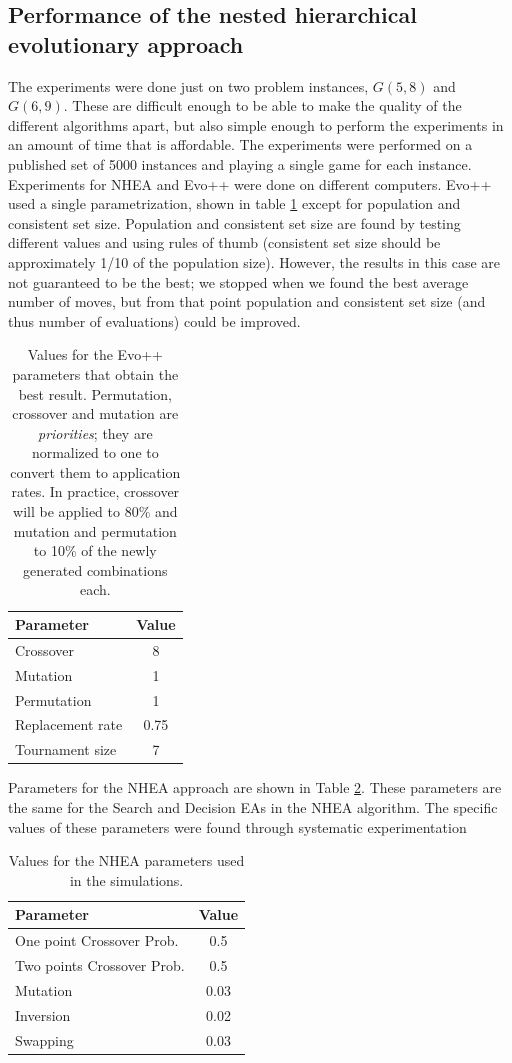 \subsection{Performance of the nested hierarchical evolutionary approach}

The experiments were done just on two problem instances, $G(5,8)$ and $G(6,9)$. These are difficult enough to be able
to make the quality of the different algorithms apart, but also simple
enough to perform the experiments in an amount of time that is
affordable. The experiments were performed on a published set of 5000
instances and playing a single game for each instance. Experiments
for NHEA and Evo++ were done on different computers. Evo++ used a single
parametrization, shown in table \ref{tab:params} except for population
and consistent set size. Population and consistent set size are found
by testing different values and using rules of thumb (consistent set
size should be approximately 1/10 of the population size). However, the
results in this case are not guaranteed to be the best; we stopped
when we found the best average number of moves, but from that point
population and consistent set size (and thus number of evaluations)
could be improved.

\begin{table}[!ht]
\centering
\caption{Values for the Evo++ parameters that obtain the best
  result. Permutation, crossover and mutation are {\em priorities};
  they are normalized to one to convert them to application rates. In
  practice, crossover will be applied to 80\% and mutation and
  permutation to 10\% of the newly generated combinations each. \label{tab:params}}
\begin{tabular}{lc}
\hline
Parameter & Value \\
\hline
Crossover  & 8 \\
Mutation  & 1 \\
Permutation  & 1 \\
Replacement rate  & 0.75 \\
Tournament size & 7 \\
\hline
\end{tabular}
\end{table}
%

Parameters for the NHEA approach are shown in Table \ref{tab:paramsBS}. These parameters are the same for the
Search and Decision EAs in the NHEA algorithm. The specific values of
these parameters were found through systematic experimentation


\begin{table}[!ht]
\centering
\caption{Values for the NHEA parameters used in the simulations. \label{tab:paramsBS}}
\begin{tabular}{lc}
\hline
Parameter & Value \\
\hline
One point Crossover Prob.  & 0.5 \\
Two points Crossover Prob. & 0.5 \\
Mutation  & 0.03 \\
Inversion  & 0.02 \\
Swapping & 0.03 \\
\hline
\end{tabular}
\end{table}

